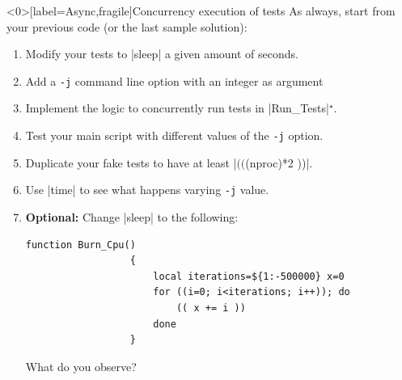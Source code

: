 \begin{frame}<0>[label=Async,fragile]{Concurrency execution of tests}
    \vspace{-1mm}
    \alert{As always, start from your previous code (or the last sample solution):}
    \begin{enumerate}
        \item Modify your tests to \bash|sleep| a given amount of seconds.
        \item Add a \texttt{-j} command line option with an integer as argument
        \item Implement the logic to concurrently run tests in \bash|Run_Tests|$^\star$.
        \item Test your main script with different values of the \texttt{-j} option.
        \item Duplicate your fake tests to have at least \bash|$(( $(nproc)*2 ))|.
        \item Use \bash|time| to see what happens varying \texttt{-j} value.
        \item \textbf{Optional:} Change \bash|sleep| to the following:
              \begin{lstlisting}[style=MyBash, numbers=none, aboveskip=3mm, belowskip=-5mm, emph={[2]{i, x, iterations}}, alsoletter={0123456789![]/\{\}.:}]
                  function Burn_Cpu()
                  {
                      local iterations=${1:-500000} x=0
                      for ((i=0; i<iterations; i++)); do
                          (( x += i ))
                      done
                  }
              \end{lstlisting}
              What do you observe?
    \end{enumerate}

\end{frame}

